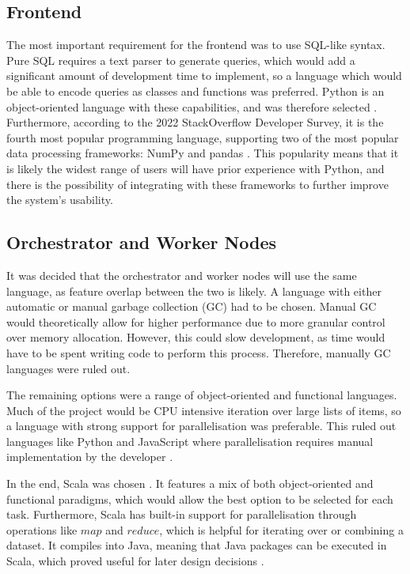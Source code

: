 \subsection{Frontend}\label{subsec:frontend-design}
The most important requirement for the frontend was to use SQL-like syntax. Pure SQL requires a text parser to generate queries, which would add a significant amount of development time to implement, so a language which would be able to encode queries as classes and functions was preferred. Python is an object-oriented language with these capabilities, and was therefore selected \cite{python3-10}. Furthermore, according to the 2022 StackOverflow Developer Survey, it is the fourth most popular programming language, supporting two of the most popular data processing frameworks: NumPy and pandas \cite{stackoverflowsurvey2022, reback2020pandas, harris2020array}. This popularity means that it is likely the widest range of users will have prior experience with Python, and there is the possibility of integrating with these frameworks to further improve the system's usability. 

\subsection{Orchestrator and Worker Nodes}
It was decided that the orchestrator and worker nodes will use the same language, as feature overlap between the two is likely. A language with either automatic or manual garbage collection (GC) had to be chosen. Manual GC would theoretically allow for higher performance due to more granular control over memory allocation. However, this could slow development, as time would have to be spent writing code to perform this process. Therefore, manually GC languages were ruled out.

The remaining options were a range of object-oriented and functional languages. Much of the project would be CPU intensive iteration over large lists of items, so a language with strong support for parallelisation was preferable. This ruled out languages like Python and JavaScript where parallelisation requires manual implementation by the developer \cite{pythonmultiprocessing, nodeworkerthreads}.

In the end, Scala was chosen \cite{scaladocs}. It features a mix of both object-oriented and functional paradigms, which would allow the best option to be selected for each task. Furthermore, Scala has built-in support for parallelisation through operations like $map$ and $reduce$, which is  helpful for iterating over or combining a dataset. It compiles into Java, meaning that Java packages can be executed in Scala, which proved useful for later design decisions \cite{scalaforjavadevs}.
 
